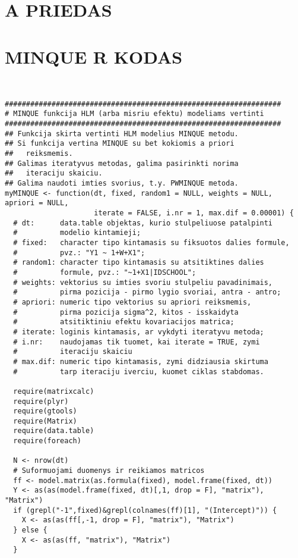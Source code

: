 \documentclass[11pt,a4paper]{article}
\begin{document}
\newpage
\begin{appendix}

 \hypertarget{appendixa}{\section*{A PRIEDAS}}
\section*{MINQUE R KODAS}

\begin{footnotesize}
\begin{verbatim}


#################################################################
# MINQUE funkcija HLM (arba misriu efektu) modeliams vertinti
#################################################################
## Funkcija skirta vertinti HLM modelius MINQUE metodu. 
## Si funkcija vertina MINQUE su bet kokiomis a priori 
##   reiksmemis.
## Galimas iteratyvus metodas, galima pasirinkti norima 
##   iteraciju skaiciu.
## Galima naudoti imties svorius, t.y. PWMINQUE metoda.
myMINQUE <- function(dt, fixed, random1 = NULL, weights = NULL, apriori = NULL,
                     iterate = FALSE, i.nr = 1, max.dif = 0.00001) {
  # dt:      data.table objektas, kurio stulpeliuose patalpinti 
  #          modelio kintamieji;
  # fixed:   character tipo kintamasis su fiksuotos dalies formule,
  #          pvz.: "Y1 ~ 1+W+X1";
  # random1: character tipo kintamasis su atsitiktines dalies
  #          formule, pvz.: "~1+X1|IDSCHOOL";
  # weights: vektorius su imties svoriu stulpeliu pavadinimais,
  #          pirma pozicija - pirmo lygio svoriai, antra - antro;
  # apriori: numeric tipo vektorius su apriori reiksmemis,
  #          pirma pozicija sigma^2, kitos - isskaidyta 
  #          atsitiktiniu efektu kovariacijos matrica;
  # iterate: loginis kintamasis, ar vykdyti iteratyvu metoda;
  # i.nr:    naudojamas tik tuomet, kai iterate = TRUE, zymi
  #          iteraciju skaiciu
  # max.dif: numeric tipo kintamasis, zymi didziausia skirtuma
  #          tarp iteraciju iverciu, kuomet ciklas stabdomas.
  
  require(matrixcalc)
  require(plyr)
  require(gtools)
  require(Matrix)
  require(data.table)
  require(foreach)
  
  N <- nrow(dt)
  # Suformuojami duomenys ir reikiamos matricos
  ff <- model.matrix(as.formula(fixed), model.frame(fixed, dt))
  Y <- as(as(model.frame(fixed, dt)[,1, drop = F], "matrix"), "Matrix")
  if (grepl("-1",fixed)&grepl(colnames(ff)[1], "(Intercept)")) {
    X <- as(as(ff[,-1, drop = F], "matrix"), "Matrix")
  } else {
    X <- as(as(ff, "matrix"), "Matrix")
  }
  

\end{verbatim}
\end{footnotesize}
\end{appendix}
\end{document}
